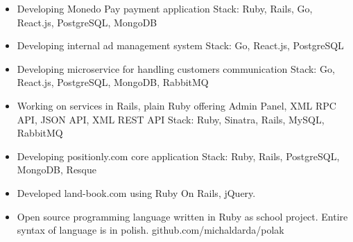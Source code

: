 \documentclass[10pt,a4paper,ragged2e]{altacv}
\begin{document}
\begin{itemize}
\item Developing Monedo Pay payment application \newline
Stack: Ruby, Rails, Go, React.js, PostgreSQL, MongoDB \newline

\item Developing internal ad management system \newline
Stack: Go, React.js, PostgreSQL

\item Developing microservice for handling customers communication \newline
Stack: Go, React.js, PostgreSQL, MongoDB, RabbitMQ
\end{itemize}

\begin{itemize}
\item Working on services in Rails, plain Ruby offering Admin Panel,
XML RPC API, JSON API, XML REST API \newline
Stack: Ruby, Sinatra, Rails, MySQL, RabbitMQ
\end{itemize}

\begin{itemize}
\item Developing positionly.com core application \newline
Stack: Ruby, Rails, PostgreSQL, MongoDB, Resque
\end{itemize}


\begin{itemize}
\item Developed land-book.com using Ruby On Rails, jQuery.
\end{itemize}

\begin{itemize}
\item Open source programming language written in Ruby as
school project. Entire syntax of language is in polish. \newline
github.com/michaldarda/polak
\end{itemize}

\medskip

\clearpage

\nocite{*}

\end{document}
